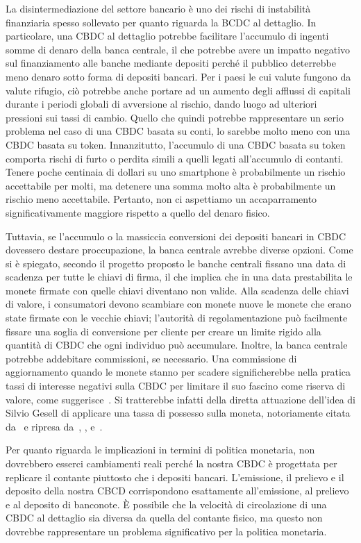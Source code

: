 \documentclass{article}
\begin{document}
La disintermediazione del settore bancario è uno dei rischi di
instabilità finanziaria spesso sollevato per quanto riguarda la BCDC
al dettaglio. In particolare, una CBDC al dettaglio potrebbe
facilitare l'accumulo di ingenti somme di denaro della banca
centrale, il che potrebbe avere un impatto negativo sul finanziamento
alle banche mediante depositi perché il pubblico deterrebbe meno
denaro sotto forma di depositi bancari. Per i paesi le cui valute
fungono da valute rifugio, ciò potrebbe anche portare ad un aumento
degli afflussi di capitali durante i periodi globali di avversione al
rischio, dando luogo ad ulteriori pressioni sui tassi di cambio.
Quello che quindi potrebbe rappresentare un serio problema nel caso di
una CBDC basata su conti, lo sarebbe molto meno con una CBDC basata
su token. Innanzitutto, l'accumulo di una CBDC basata su token comporta
rischi di furto o perdita simili a quelli legati all'accumulo di
contanti. Tenere poche centinaia di dollari su uno smartphone è
probabilmente un rischio accettabile per molti, ma detenere una somma
molto alta è probabilmente un rischio meno accettabile. Pertanto, non
ci aspettiamo un accaparramento significativamente maggiore rispetto a
quello del denaro fisico.

Tuttavia, se l'accumulo o la massiccia conversioni dei depositi
bancari in CBDC dovessero destare proccupazione, la banca centrale
avrebbe diverse opzioni. Come si è spiegato, secondo il progetto
proposto le banche centrali fissano una data di scadenza per tutte le
chiavi di firma, il che implica che in una data prestabilita le monete
firmate con quelle chiavi diventano non valide. Alla scadenza delle
chiavi di valore, i consumatori devono scambiare con monete nuove le
monete che erano state firmate con le vecchie chiavi; l'autorità di
regolamentazione può facilmente fissare una soglia di conversione per
cliente per creare un limite rigido alla quantità di CBDC che ogni
individuo può accumulare. Inoltre, la banca centrale potrebbe addebitare
commissioni, se necessario. Una commissione di aggiornamento quando le monete
stanno per scadere significherebbe nella pratica tassi di interesse negativi
sulla CBDC per limitare il suo fascino come riserva di valore, come
suggerisce~\cite{Bindseil}. Si tratterebbe infatti della diretta attuazione
dell'idea di Silvio Gesell di applicare una tassa di possesso sulla moneta,
notoriamente citata da~\cite{Keynes} e ripresa da~\cite{Goodfriend},
\cite{Buiter}, e~\cite{Agarwal}.

Per quanto riguarda le implicazioni in termini di politica monetaria,
non dovrebbero esserci cambiamenti reali perché la nostra CBDC è
progettata per replicare il contante piuttosto che i depositi bancari.
L'emissione, il prelievo e il deposito della nostra CBCD corrispondono
esattamente all'emissione, al prelievo e al deposito di banconote. È
possibile che la velocità di circolazione di una CBDC al dettaglio sia
diversa da quella del contante fisico, ma questo non dovrebbe
rappresentare un problema significativo per la politica monetaria.
\end{document}
